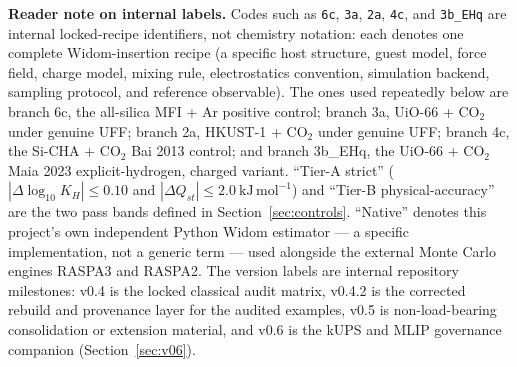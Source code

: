 \textbf{Reader note on internal labels.} Codes such as \texttt{6c}, \texttt{3a}, \texttt{2a}, \texttt{4c}, and \texttt{3b\_EHq} are internal locked-recipe identifiers, not chemistry notation: each denotes one complete Widom-insertion recipe (a specific host structure, guest model, force field, charge model, mixing rule, electrostatics convention, simulation backend, sampling protocol, and reference observable). The ones used repeatedly below are branch 6c, the all-silica MFI + Ar positive control; branch 3a, UiO-66 + CO\(_2\) under genuine UFF; branch 2a, HKUST-1 + CO\(_2\) under genuine UFF; branch 4c, the Si-CHA + CO\(_2\) Bai 2013 control; and branch 3b\_EHq, the UiO-66 + CO\(_2\) Maia 2023 explicit-hydrogen, charged variant. ``Tier-A strict'' (\(|\Delta\log_{10}K_H|\le0.10\) and \(|\Delta Q_{st}|\le2.0\ \mathrm{kJ\,mol^{-1}}\)) and ``Tier-B physical-accuracy'' are the two pass bands defined in Section~\ref{sec:controls}. ``Native'' denotes this project's own independent Python Widom estimator --- a specific implementation, not a generic term --- used alongside the external Monte Carlo engines RASPA3 and RASPA2. The version labels are internal repository milestones: v0.4 is the locked classical audit matrix, v0.4.2 is the corrected rebuild and provenance layer for the audited examples, v0.5 is non-load-bearing consolidation or extension material, and v0.6 is the kUPS and MLIP governance companion (Section~\ref{sec:v06}).

